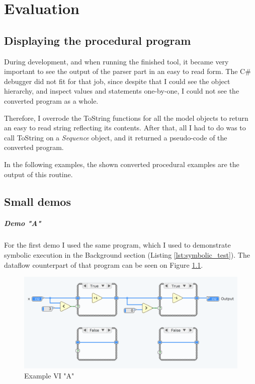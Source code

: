 \chapter{Evaluation}
\section{Displaying the procedural program}
During development, and when running the finished tool, it became very important to see the output of the parser part in an easy to read form. The C\# debugger did not fit for that job, since despite that I could see the object hierarchy, and inspect values and statements one-by-one, I could not see the converted program as a whole. 

Therefore, I overrode the ToString functions for all the model objects to return an easy to read string reflecting its contents. After that, all I had to do was to call ToString on a \textit{Sequence} object, and it returned a pseudo-code of the converted program.

In the following examples, the shown converted procedural examples are the output of this routine.
\section{Small demos}
\paragraph{Demo "A"}
For the first demo I used the same program, which I used to demonstrate symbolic execution in the Background section (Listing \ref{lst:symbolic_test}). The dataflow counterpart of that program can be seen on Figure \ref{fig:testvi1}.
\begin{figure}
\centering
\includegraphics[width=150mm,keepaspectratio]{figures/testvi1.png}
\caption{Example VI "A"} 
\label{fig:testvi1}
\end{figure}

